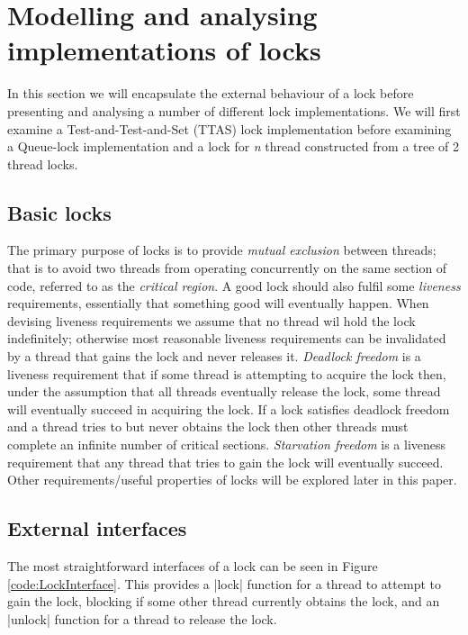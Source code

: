 \section{Modelling and analysing implementations of locks}
\label{sec:locks}

\inlineScala



In this section we will encapsulate the external behaviour of a lock before presenting and analysing a number of different lock implementations. We will first examine a Test-and-Test-and-Set (TTAS) lock implementation\cite{TAoMP} before examining a Queue-lock implementation and a lock for \textit{n} thread constructed from a tree of 2 thread locks.

\subsection{Basic locks}

The primary purpose of locks is to provide \emph{mutual exclusion} between threads; that is to avoid two threads from operating concurrently on the same section of code, referred to as the \emph{critical region}. A good lock should also fulfil some \emph{liveness} requirements, essentially that something good will eventually happen. When devising liveness requirements we assume that no thread wil hold the lock indefinitely; otherwise most reasonable liveness requirements can be invalidated by a thread that gains the lock and never releases it. \emph{Deadlock freedom} is a liveness requirement that if some thread is attempting to acquire the lock then, under the assumption that all threads eventually release the lock, some thread will eventually succeed in acquiring the lock. If a lock satisfies deadlock freedom and a thread tries to but never obtains the lock then other threads must complete an infinite number of critical sections. \emph{Starvation freedom} is a liveness requirement that any thread that tries to gain the lock will eventually succeed. Other requirements/useful properties of locks will be explored later in this paper.

\subsection{External interfaces}

The most straightforward interfaces of a lock can be seen in Figure \ref{code:LockInterface}. This provides a |lock| function for a thread to attempt to gain the lock, blocking if some other thread currently obtains the lock, and an |unlock| function for a thread to release the lock. 

